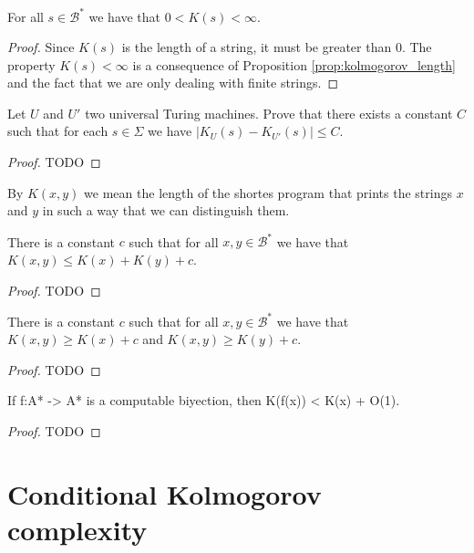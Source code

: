 \begin{proposition}
For all $s\in\mathcal{B}^{\ast}$ we have that $0 < K(s) < \infty$.
\end{proposition}
\begin{proof}
Since $K(s)$ is the length of a string, it must be greater than $0$. The property $K(s) < \infty$ is a consequence of Proposition \ref{prop:kolmogorov_length} and the fact that we are only dealing with finite strings.
\end{proof}


\begin{proposition}
Let $U$ and $U'$ two universal Turing machines. Prove that there exists a constant $C$ such that for each $s \in \Sigma$ we have $\mid K_{U}(s) - K_{U'}(s) \mid \leq C$.
\end{proposition}
\begin{proof}
{\color{red} TODO}
\end{proof}

By $K(x, y)$ we mean the length of the shortes program that prints the strings $x$ and $y$ in such a way that we can distinguish them.

\begin{proposition}
\label{prop:additive_kolmogorov}
There is a constant $c$ such that for all $x, y \in\mathcal{B}^{\ast}$ we have that $K(x, y) \leq K(x) + K(y) + c$.
\end{proposition}
\begin{proof}
{\color{red} TODO}
\end{proof}

\begin{proposition}
\label{prop:excess_kolmogorov}
There is a constant $c$ such that for all $x, y \in\mathcal{B}^{\ast}$ we have that $K(x, y) \geq K(x) + c$ and $K(x, y) \geq K(y) + c$.
\end{proposition}
\begin{proof}
{\color{red} TODO}
\end{proof}


\begin{proposition}
If f:A* -> A* is a computable biyection, then K(f(x)) < K(x) + O(1).
\end{proposition}
\begin{proof}
{\color{red} TODO}
\end{proof}

%
%

\section{Conditional Kolmogorov complexity}

